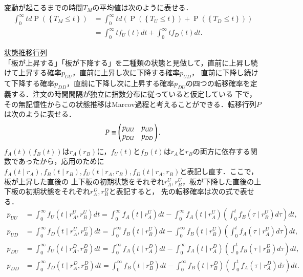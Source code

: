 \documentclass[a4j,papersize,disablejfam,slide,14pt]{jsarticle}
\def\prob#1{\operatorname{P} \left(\left\{ #1 \right\}\right)} %
\begin{document}
    変動が起こるまでの時間$T_M$の平均値は次のように表せる．
    \begin{align}
    	\int_{0}^{\infty} t d\prob{T_M \leq t} &= \int_{0}^{\infty} t d(\prob{T_U \leq t} + \prob{T_D \leq t}) \\
        &= \int_{0}^{\infty} t f_U(t) dt + \int_{0}^{\infty} t f_D(t) dt.
    \end{align}
    
\underline{\large 状態推移行列}\\
    「板が上昇する」「板が下降する」を二種類の状態と見做して，直前に上昇し続けて上昇する確率$p_{UU}$，直前に上昇し次に下降する確率$p_{UD}$，
    直前に下降し続けて下降する確率$p_{DD}$，直前に下降し次に上昇する確率$p_{DU}$の四つの転移確率を定義する．注文の時間間隔が独立に指数分布に従っていると仮定している
    下で，その無記憶性からこの状態推移は{\rm Marcov}過程と考えることができる．転移行列$P$は次のように表せる．
    \begin{align}
    	P \equiv \left(
    	\begin{array}{@{\,}cc@{\,}}
    		p_{UU} & p_{UD} \\
            p_{DU} & p_{DD}
    	\end{array}
    	\right). \\ \label{eq:transient_probability_matrix}
    \end{align}
    $f_A(t)(f_B(t))$は$r_A(r_B)$に，$f_U(t)$と$f_D(t)$は$r_A$と$r_B$の両方に依存する関数であったから，応用のために
    $f_A(t \mid r_A), f_B(t \mid r_B), f_U(t \mid r_A, r_B), f_D(t \mid r_A, r_B)$と表記し直す．ここで，板が上昇した直後の
    上下板の初期状態をそれぞれ$r_A^U, r_B^U$，板が下降した直後の上下板の初期状態をそれぞれ$r_A^D, r_B^D$と表記すると，
    先の転移確率は次の式で表せる．
    \begin{align}
    	p_{UU} &= \int_{0}^{\infty} f_U(t \mid r_A^U, r_B^U) dt = \int_{0}^{\infty} f_A(t \mid r_A^U)dt - \int_{0}^{\infty} f_A(t \mid r_A^U) \left( \int_{0}^{t} f_B(\tau \mid r_B^U)d\tau \right) dt, \\
        p_{UD} &= \int_{0}^{\infty} f_D(t \mid r_A^U, r_B^U) dt = \int_{0}^{\infty} f_B(t \mid r_B^U)dt - \int_{0}^{\infty} f_B(t \mid r_B^U) \left( \int_{0}^{t} f_A(\tau \mid r_A^U)d\tau \right) dt, \\
        p_{DU} &= \int_{0}^{\infty} f_U(t \mid r_A^D, r_B^D) dt = \int_{0}^{\infty} f_A(t \mid r_A^D)dt - \int_{0}^{\infty} f_A(t \mid r_A^D) \left( \int_{0}^{t} f_B(\tau \mid r_B^D)d\tau \right) dt, \\
        p_{DD} &= \int_{0}^{\infty} f_D(t \mid r_A^D, r_B^D) dt = \int_{0}^{\infty} f_B(t \mid r_B^D)dt - \int_{0}^{\infty} f_B(t \mid r_B^D) \left( \int_{0}^{t} f_A(\tau \mid r_A^D)d\tau \right) dt.
    \end{align}
\end{document}
